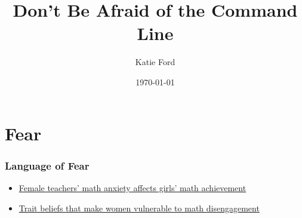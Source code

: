 \documentclass{beamer}
\begin{document}
\hypersetup{
    colorlinks=true,
    linkcolor=blue,
    filecolor=magenta,      
    urlcolor=cyan,
}
 

\title{Don't Be Afraid of the Command Line}
\author{Katie Ford}
\date{\today}

\frame{\titlepage}

\section[Outline]{}
\frame{\tableofcontents}



\section{Fear}
\begin{frame}
	\frametitle{Language of Fear}
	\begin{itemize}
		\item \href{https://www.pnas.org/content/107/5/1860}{Female teachers' math anxiety affects girls' math achievement}
		\pause
		\item \href{https://www.sciencedirect.com/science/article/abs/pii/S0191886909003833}{Trait beliefs that make women vulnerable to math disengagement}
	\end{itemize}
\end{frame}
\end{document}

